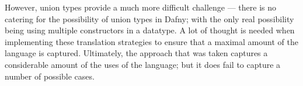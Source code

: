 \documentclass{entcs}
\begin{document}


However, union types provide a much more difficult challenge --- there is no catering for the possibility of union types in Dafny; with the only real possibility being using multiple constructors in a datatype. A lot of thought is needed when implementing these translation strategies to ensure that a maximal amount of the language is captured. Ultimately, the approach that was taken captures a considerable amount of the uses of the language; but it does fail to capture a number of possible cases.
\end{document}
